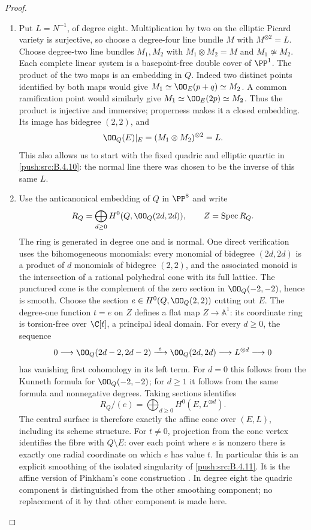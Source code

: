 \begin{proof}
\begin{enumerate}[label=\arabic*.,leftmargin=*]
\item Put $L=N^{-1}$, of degree eight.  Multiplication by two on the
elliptic Picard variety is surjective, so choose a degree-four
line bundle $M$ with $M^{\otimes2}=L$.
Choose degree-two line bundles $M_1,M_2$ with
$M_1\otimes M_2=M$ and $M_1\not\simeq M_2$.
Each complete linear system is a basepoint-free double cover of
$\PP^1$.  The product of the two maps is an embedding in $Q$.
Indeed two distinct points identified by both maps would give
$M_1\simeq\OO_E(p+q)\simeq M_2$.
A common ramification point would similarly give
$M_1\simeq\OO_E(2p)\simeq M_2$.
Thus the product is injective and immersive; properness makes it a
closed embedding.  Its image has bidegree $(2,2)$, and
\[
 \OO_Q(E)|_E=(M_1\otimes M_2)^{\otimes2}=L.
\]
This also allows us to start with the fixed quadric and elliptic
quartic in \ref{push:src:B.4.10}: the normal line there was chosen to be the
inverse of this same $L$.

\item Use the anticanonical embedding of $Q$ in $\PP^8$ and write
\[
 R_Q=\bigoplus_{d\ge0}H^0(Q,\OO_Q(2d,2d)),\qquad
 Z=\operatorname{Spec}R_Q.
\]
The ring is generated in degree one and is normal.
One direct verification uses the bihomogeneous monomials:
every monomial of bidegree $(2d,2d)$ is a product of $d$
monomials of bidegree $(2,2)$, and the associated monoid is the
intersection of a rational polyhedral cone with its full lattice.
The punctured cone is the complement of the zero section in
$\OO_Q(-2,-2)$, hence is smooth.
Choose the section $e\in H^0(Q,\OO_Q(2,2))$ cutting out $E$.
The degree-one function $t=e$ on $Z$ defines a flat map
$Z\to\mathbb A^1$: its coordinate ring is torsion-free over
$\C[t]$, a principal ideal domain.
For every $d\ge0$, the sequence
\[
 0\longrightarrow\OO_Q(2d-2,2d-2)
 \xrightarrow{\ e\ }\OO_Q(2d,2d)
 \longrightarrow L^{\otimes d}\longrightarrow0
\]
has vanishing first cohomology in its left term.
For $d=0$ this follows from the Kunneth formula for
$\OO_Q(-2,-2)$; for $d\ge1$ it follows from the same formula
and nonnegative degrees.
Taking sections identifies
\[
 R_Q/(e)=\bigoplus_{d\ge0}H^0(E,L^{\otimes d}).
\]
The central surface is therefore exactly the affine cone over
$(E,L)$, including its scheme structure.
For $t\ne0$, projection from the cone vertex identifies the
fibre with $Q\setminus E$: over each point where $e$ is nonzero
there is exactly one radial coordinate on which $e$ has value $t$.
In particular this is an explicit smoothing of the isolated
singularity of \ref{push:src:B.4.11}.
It is the affine version of Pinkham's cone construction
\citep[Remark~7.6(iii), p.~46; Section~9, pp.~63--65]{Pinkham1974Root}.
In degree eight the quadric component is distinguished from the
other smoothing component; no replacement of it by that other
component is made here.


\end{enumerate}
\end{proof}
